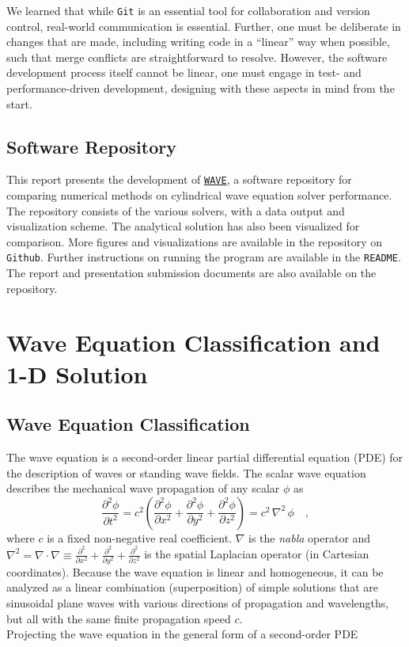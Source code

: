 \documentclass{homework}
\begin{document}
We learned that while \texttt{Git} is an essential tool for collaboration and version control, real-world communication is essential. Further, one must be deliberate in changes that are made, including writing code in a ``linear'' way when possible, such that merge conflicts are straightforward to resolve. However, the software development process itself cannot be linear, one must engage in test- and performance-driven development, designing with these aspects in mind from the start.

\subsection{\textbf{Software Repository}} This report presents the development of \href{https://github.com/mw6136/WAVE}{\texttt{WAVE}}, a software repository for comparing numerical methods on cylindrical wave equation solver performance. The repository consists of the various solvers, with a data output and visualization scheme. The analytical solution has also been visualized for comparison. More figures and visualizations are available in the repository on \texttt{Github}. Further instructions on running the program are available in the \texttt{README}. The report and presentation submission documents are also available on the repository.




\newpage
\appendix
\section{Wave Equation Classification and 1-D Solution} \label{A}
\subsection{Wave Equation Classification}
The wave equation is a second-order linear partial differential equation (PDE) for the description of waves or standing wave fields. The scalar wave equation describes the mechanical wave propagation of any scalar $\phi$ as 
\[ \frac{\partial^2 \phi}{\partial t^2} = c^2 \left(\frac{\partial^2 \phi}{\partial x^2} + \frac{\partial^2 \phi}{\partial y^2} + \frac{\partial^2 \phi}{\partial z^2}  \right) = c^2 \,\nabla^2 \, \phi \quad ,\]
\noindent
where $c$ is a fixed non-negative real coefficient. $\nabla$ is the \emph{nabla} operator and $\nabla^2 = \nabla \cdot \nabla \equiv \frac{\partial^2}{\partial x^2} + \frac{\partial^2}{\partial y^2} + \frac{\partial^2}{\partial z^2}$ is the spatial Laplacian operator (in Cartesian coordinates). Because the wave equation is linear and homogeneous, it can be analyzed as a linear combination (superposition) of simple solutions that are sinusoidal plane waves with various directions of propagation and wavelengths, but all with the same finite propagation speed $c$. 
\\[5pt] \noindent
Projecting the wave equation in the general form of a second-order PDE
\end{document}
